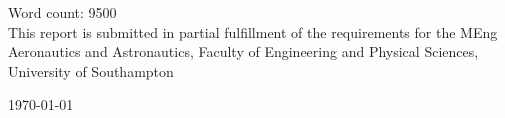 \documentclass[../Interim_Report_Master]{subfiles}
\begin{document}
\begin{titlepage}
\vspace{10cm}
       

\vspace{-1cm}
Word count: 9500 \\
\vspace{1cm}
This report is submitted in partial fulfillment of the requirements for the MEng Aeronautics and Astronautics, Faculty of Engineering and Physical Sciences, University of Southampton


\vspace{0.5cm}
\large \today %

\vfill %

\end{titlepage}
\end{document}
